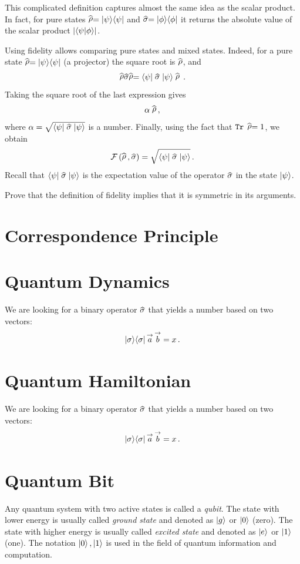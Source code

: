 This complicated definition captures almost the same idea as the scalar product. In fact, for pure states $\op{\rho}=\ketbra{\psi}{\psi}$ and $\op{\sigma}=\ketbra{\phi}{\phi}$ it returns the absolute value of the scalar product $|\langle{\psi}|{\phi\rangle}|$.

Using fidelity allows comparing pure states and mixed states. Indeed, for a pure state $\op{\rho}=\ketbra{\psi}{\psi}$ (a projector) the square root is $\op{\rho}$, and 
\[
\op{\rho}\op{\sigma}\op{\rho}=\bra{\psi}\op{\sigma}\ket{\psi}\op{\rho}\,.
\]
Taking the square root of the last expression gives
\[
\alpha\op{\rho}\,,
\]
where $\alpha=\sqrt{\bra{\psi}\op{\sigma}\ket{\psi}}$ is a number. Finally, using the fact that $\mathtt{Tr}\,\op{\rho}=1$, we obtain
\[
\mathcal{F}\,(\op{\rho}\,,\op{\sigma}) =\sqrt{\bra{\psi}\op{\sigma}\ket{\psi}}\,.
\]
Recall that $\bra{\psi}\op{\sigma}\ket{\psi}$ is the expectation value of the operator $\op{\sigma}$ in the state $|{\psi}\rangle$.

\begin{exercise}
	Prove that the definition of fidelity implies that it is symmetric in its arguments.
\end{exercise}

\section{Correspondence Principle}\label{sec:CorrespondencePrinciple}


\section{Quantum Dynamics}\label{sec:QuantumDynamics}
We are looking for a binary operator $\op{\sigma}$ that yields a number
based on two vectors:
\[
|{\sigma}\rangle\langle{\sigma}|\,\overset{\rightarrow}{a}\,\overset{\rightarrow}{b}=x\,.
\]

\section{Quantum Hamiltonian}\label{sec:QuantumHamiltonian}
We are looking for a binary operator $\op{\sigma}$ that yields a number
based on two vectors:
\[
|{\sigma}\rangle\langle{\sigma}|\,\overset{\rightarrow}{a}\,\overset{\rightarrow}{b}=x\,.
\]


\section{Quantum Bit}\label{sec:Qubit}
Any quantum system with two active states is called a \emph{qubit}. The state with lower energy is usually called \emph{ground state} and denoted as $|{g}\rangle$ or $|{0}\rangle$ (zero). The state with higher energy is usually called \emph{excited state} and denoted as $|{e}\rangle$ or $|{1}\rangle$ (one). The notation $|{0}\rangle\,,|{1}\rangle$ is used in the field of quantum information and computation.

